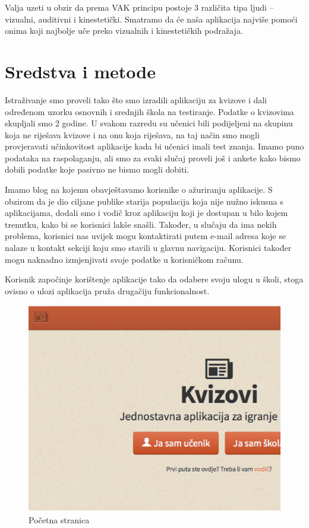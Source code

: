 \documentclass{scrreprt}
\begin{document}
Valja uzeti u obzir da prema VAK principu postoje 3 različita tipa ljudi --
vizualni, auditivni i kinestetički.\cite{clark11} Smatramo da će naša aplikacija
najviše pomoći onima koji najbolje uče preko vizualnih i kinestetičkih
podražaja.

\chapter{Sredstva i metode}

Istraživanje smo proveli tako što smo izradili aplikaciju za kvizove i dali
određenom uzorku osnovnih i srednjih škola na testiranje. Podatke o kvizovima
skupljali smo 2 godine. U svakom razredu su učenici bili podijeljeni na skupinu
koja ne riješava kvizove i na onu koja riješava, na taj način smo mogli
provjeravati učinkovitost aplikacije kada bi učenici imali test znanja. Imamo
puno podataka na raspolaganju, ali smo za svaki slučaj proveli još i ankete kako
bismo dobili podatke koje pasivno ne bismo mogli dobiti.

Imamo blog na kojemu obavještavamo korisnike o ažuriranju aplikacije. S obzirom
da je dio ciljane publike starija populacija koja nije nužno iskusna s
aplikacijama, dodali smo i vodič kroz aplikaciju koji je dostupan u bilo kojem
trenutku, kako bi se korisnici lakše snašli. Također, u slučaju da ima nekih
problema, korisnici nas uvijek mogu kontaktirati putem e-mail adresa koje se
nalaze u kontakt sekciji koju smo stavili u glavnu navigaciju. Korisnici također
mogu naknadno izmjenjivati svoje podatke u korisničkom računu.

Korisnik započinje korištenje aplikacije tako da odabere svoju ulogu u školi,
stoga ovisno o ulozi aplikacija pruža drugačiju funkcionalnost.

\begin{figure}[H]
  \includegraphics[width=\textwidth, clip=true, trim=0 7cm 0 0, fbox]{home}
  \caption{Početna stranica}
\end{figure}
\end{document}
